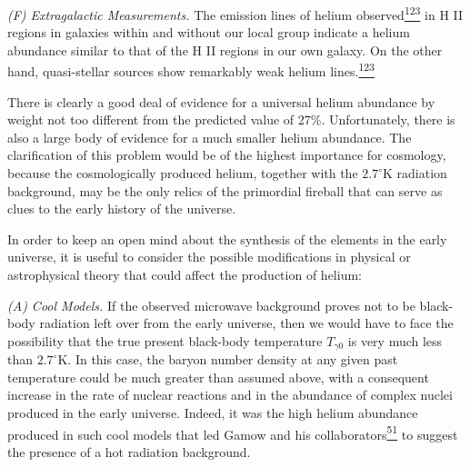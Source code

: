 \emph{(F) Extragalactic Measurements.} The emission lines of helium
observed\hyperref[ch15-ref-123]{\textsuperscript{123}} in H II regions in
galaxies within and without our local group indicate a helium abundance
similar to that of the H II regions in our own galaxy. On the other hand,
quasi-stellar sources show remarkably weak helium
lines.\hyperref[ch15-ref-123]{\textsuperscript{123}}

There is clearly a good deal of evidence for a universal helium abundance by
weight not too different from the predicted value of 27\%. Unfortunately,
there is also a large body of evidence for a much smaller helium abundance.
The clarification of this problem would be of the highest importance for
cosmology, because the cosmologically produced helium, together with the
\(2.7^\circ\mathrm K\) radiation background, may be the only relics of the
primordial fireball that can serve as clues to the early history of the
universe.

In order to keep an open mind about the synthesis of the elements in the
early universe, it is useful to consider the possible modifications in
physical or astrophysical theory that could affect the production of helium:

\emph{(A) Cool Models.} If the observed microwave background proves not to
be black-body radiation left over from the early universe, then we would have
to face the possibility that the true present black-body temperature
\(T_{\gamma0}\) is very much less than \(2.7^\circ\mathrm K\). In this case,
the baryon number density at any given past temperature could be much greater
than assumed above, with a consequent increase in the rate of nuclear
reactions and in the abundance of complex nuclei produced in the early
universe. Indeed, it was the high helium abundance produced in such cool
models that led Gamow and his
collaborators\hyperref[ch15-ref-51]{\textsuperscript{51}} to suggest the
presence of a hot radiation background.

